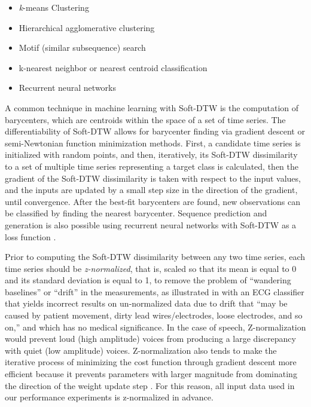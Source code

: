 \documentclass[12pt, letterpaper]{article}
\begin{document}
\begin{itemize}
  \item \emph{k}-means Clustering
  \item Hierarchical agglomerative clustering
  \item Motif (similar subsequence) search
  \item k-nearest neighbor or nearest centroid classification
  \item Recurrent neural networks
\end{itemize}

A common technique in machine learning with Soft-DTW is the computation of
barycenters, which are centroids within the space of a set of time series. The
differentiability of Soft-DTW allows for barycenter finding via gradient descent
or semi-Newtonian function minimization methods. First, a candidate time series
is initialized with random points, and then, iteratively, its Soft-DTW
dissimilarity to a set of multiple time series representing a target class is
calculated, then the gradient of the Soft-DTW dissimilarity is taken with
respect to the input values, and the inputs are updated by a small step size in
the direction of the gradient, until convergence. After the best-fit barycenters
are found, new observations can be classified by finding the nearest barycenter.
Sequence prediction and generation is also possible using recurrent neural
networks with Soft-DTW as a loss function \cite{cuturi_soft-dtw_2018}.

Prior to computing the Soft-DTW dissimilarity between any two time series, each
time series should be \emph{z-normalized}, that is, scaled so that its mean is
equal to 0 and its standard deviation is equal to 1, to remove the problem of
``wandering baselines'' or ``drift'' in the measurements, as illustrated in
\cite{rakthanmanon_addressing_2013} with an ECG classifier that yields incorrect
results on un-normalized data due to drift that ``may be caused by patient
movement, dirty lead wires/electrodes, loose electrodes, and so on,'' and which
has no medical significance. In the case of speech, Z-normalization would
prevent loud (high amplitude) voices from producing a large discrepancy with
quiet (low amplitude) voices. Z-normalization also tends to make the iterative
process of minimizing the cost function through gradient descent more efficient
because it prevents parameters with larger magnitude from dominating the
direction of the weight update step \cite{jordan_normalizing_2018}. For this
reason, all input data used in our performance experiments is z-normalized in
advance.
\end{document}
